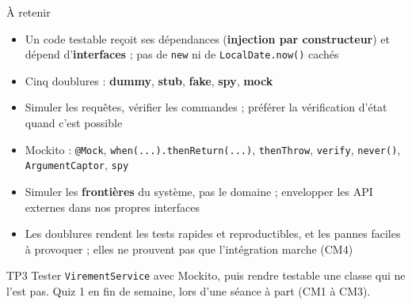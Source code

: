 \documentclass[aspectratio=169,10pt]{beamer}
\begin{document}

\begin{frame}{À retenir}
  \small
  \begin{itemize}
    \item Un code testable reçoit ses dépendances (\textbf{injection par constructeur}) et dépend d'\textbf{interfaces} ; pas de \texttt{new} ni de \texttt{LocalDate.now()} cachés
    \item Cinq doublures : \textbf{dummy}, \textbf{stub}, \textbf{fake}, \textbf{spy}, \textbf{mock}
    \item Simuler les requêtes, vérifier les commandes ; préférer la vérification d'état quand c'est possible
    \item Mockito : \texttt{@Mock}, \texttt{when(...).thenReturn(...)}, \texttt{thenThrow}, \texttt{verify}, \texttt{never()}, \texttt{ArgumentCaptor}, \texttt{spy}
    \item Simuler les \textbf{frontières} du système, pas le domaine ; envelopper les API externes dans nos propres interfaces
    \item Les doublures rendent les tests rapides et reproductibles, et les pannes faciles à provoquer ; elles ne prouvent pas que l'intégration marche (CM4)
  \end{itemize}
  \vspace{1mm}
  \begin{exampleblock}{TP3}
    Tester \texttt{VirementService} avec Mockito, puis rendre testable une classe qui ne l'est pas. \alert{Quiz 1} en fin de semaine, lors d'une séance à part (CM1 à CM3).
  \end{exampleblock}
\end{frame}

\rquestionslide
\end{document}
